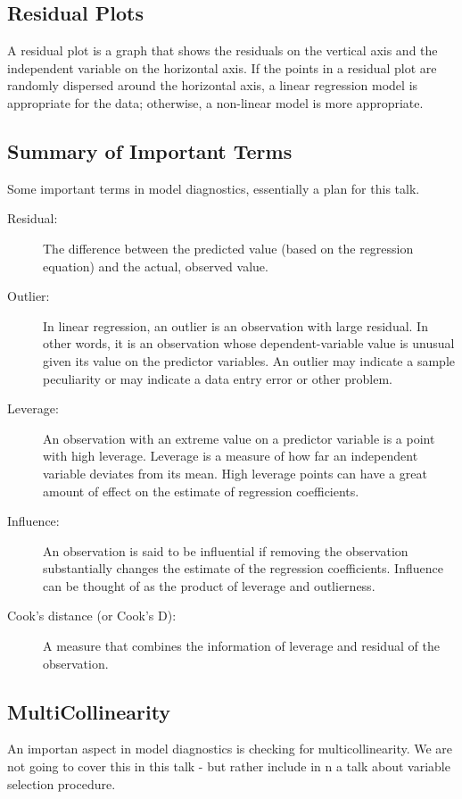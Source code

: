 \documentclass[residuals.tex]{subfiles}
\begin{document}
\large	


\subsection{Residual Plots}
A residual plot is a graph that shows the residuals on the vertical axis and the independent variable on the horizontal axis. If the points in a residual plot are randomly dispersed around the horizontal axis, a linear regression model is appropriate for the data; otherwise, a non-linear model is more appropriate.

\bigskip
\subsection*{Summary of Important Terms}
Some important terms in model diagnostics, essentially a plan for this talk.
\begin{description}
	\item[Residual: ] The difference between the predicted value (based on the regression equation) and the actual, observed value.
	\item[Outlier:]  In linear regression, an outlier is an observation with large residual.  In other words, it is an observation whose dependent-variable value is unusual given its value on the predictor variables.  An outlier may indicate a sample peculiarity or may indicate a data entry error or other problem. 
	\item[Leverage:]  An observation with an extreme value on a predictor variable is a point with high leverage.  Leverage is a measure of how far an independent variable deviates from its mean.  High leverage points can have a great amount of effect on the estimate of regression coefficients. 
	\item[Influence:]  An observation is said to be influential if removing the observation substantially changes the estimate of the regression coefficients.  Influence can be thought of as the product of leverage and outlierness.  
	\item[Cook's distance (or Cook's D):] A measure that combines the information of leverage and residual of the observation.  
\end{description}

\subsection*{MultiCollinearity}

An importan aspect in model diagnostics is checking for multicollinearity. We are not going to cover this in this talk - but rather include in n a talk about variable selection procedure.
\bigskip
\end{document}

